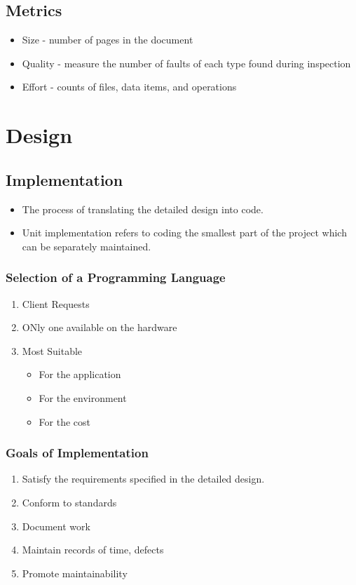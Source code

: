 \documentclass{report}
\begin{document}
		\section{Metrics}
			\begin{itemize}
				\item Size - number of pages in the document
				\item Quality - measure the number of faults of each type found during inspection
				\item Effort - counts of files, data items, and operations
			\end{itemize}
	\chapter{Design}
		\section{Implementation}
			\begin{itemize}
				\item The process of translating the detailed design into code.
				\item Unit implementation refers to coding the smallest part of the project which can be separately maintained.
			\end{itemize}
			\subsection{Selection of a Programming Language}
				\begin{enumerate}
					\item Client Requests
					\item ONly one available on the hardware
					\item Most Suitable
						\begin{itemize}
							\item For the application
							\item For the environment
							\item For the cost
						\end{itemize}
				\end{enumerate}
			\subsection{Goals of Implementation}
				\begin{enumerate}
					\item Satisfy the requirements specified in the detailed design.
					\item Conform to standards
					\item Document work
					\item Maintain records of time, defects
					\item Promote maintainability
				\end{enumerate}
\end{document}
